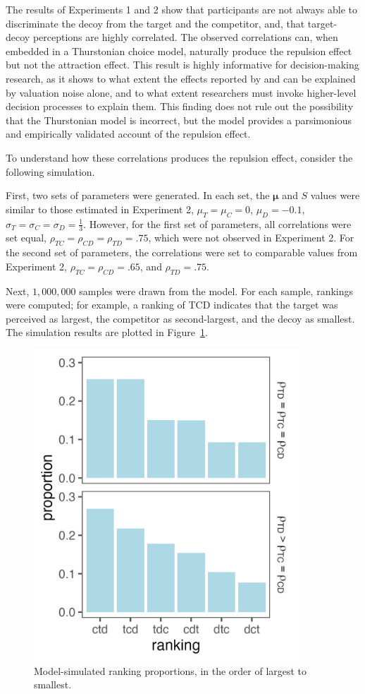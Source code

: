 The results of Experiments 1 and 2 show that participants are not always able to discriminate the decoy from the target and the competitor, and, that target-decoy perceptions are highly correlated. The observed correlations can, when embedded in a Thurstonian choice model, naturally produce the repulsion effect but not the attraction effect. This result is highly informative for decision-making research, as it shows to what extent the effects reported by \textcite{trueblood2013not} and \textcite{spektorWhenGoodLooks2018b} can be explained by valuation noise alone, and to what extent researchers must invoke higher-level decision processes to explain them. This finding does not rule out the possibility that the Thurstonian model is incorrect, but the model provides a parsimonious and empirically validated account of the repulsion effect.

To understand how these correlations produces the repulsion effect, consider the following simulation. 

First, two sets of parameters were generated. In each set, the $\boldsymbol{\mu}$ and $S$ values were similar to those estimated in Experiment 2, $\mu_{T}=\mu_{C}=0$, $\mu_{D}=-0.1$, $\sigma_{T}=\sigma_{C}=\sigma_{D}=\frac{1}{3}$. However, for the first set of parameters, all correlations were set equal, $\rho_{TC}=\rho_{CD}=\rho_{TD}=.75$, which were not observed in Experiment 2. For the second set of parameters, the correlations were set to comparable values from Experiment 2, $\rho_{TC}=\rho_{CD}=.65$, and $\rho_{TD}=.75$. 

Next, $1,000,000$ samples were drawn from the model. For each sample, rankings were computed; for example, a ranking of TCD indicates that the target was perceived as largest, the competitor as second-largest, and the decoy as smallest. The simulation results are plotted in Figure~\ref{fig:sim_orderings}. 

\begin{figure}
   \includegraphics[width=100mm]{figures/sim_mvnorm_rank.jpeg}
   \caption{Model-simulated ranking proportions, in the order of largest to smallest.}
   \label{fig:sim_orderings}
\end{figure}

